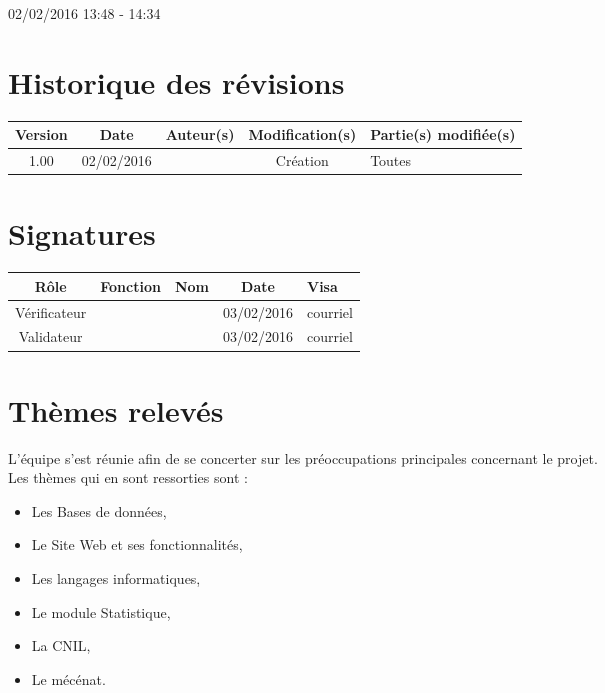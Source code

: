 \documentclass [a4paper] {article}
\begin{document}
02/02/2016			 				%
\hfill   
\hfill 	 13:48 - 14:34 				%



\section*{Historique des révisions}
\begin{center}
			\begin{tabular}{| c | c | c | c | p{4cm} |}
				\hline
				\rowcolor{Gray}
				Version & Date & Auteur(s) & Modification(s) & Partie(s) modifiée(s)		 \\
				\hline
				1.00 & 02/02/2016 & \Kafui & Création & Toutes \\
		\hline		
			\end{tabular}
		\end{center}

\section*{Signatures}

		\begin{center}
			\begin{tabular}{| c | c | c | c | p{4cm} |}
				\hline
				\rowcolor{Gray}
				Rôle & Fonction & Nom & Date & Visa		 \\
				\hline
				Vérificateur & \RQA & \Pierre & 03/02/2016 & courriel \\[30pt]
				\hline
				Validateur & \CP & \Sergi & 03/02/2016 & courriel \\[30pt]	
				\hline
			\end{tabular}
		\end{center}
		
\newpage		



\section{Thèmes relevés}
L'équipe s'est réunie afin de se concerter sur les préoccupations principales concernant le projet.
\\
Les thèmes qui en sont ressorties sont : 
\begin{itemize}
\item Les Bases de données,
\item Le Site Web et ses fonctionnalités,
\item Les langages informatiques,
\item Le module Statistique,
\item La CNIL,
\item Le mécénat.
\end{itemize}
\end{document}
